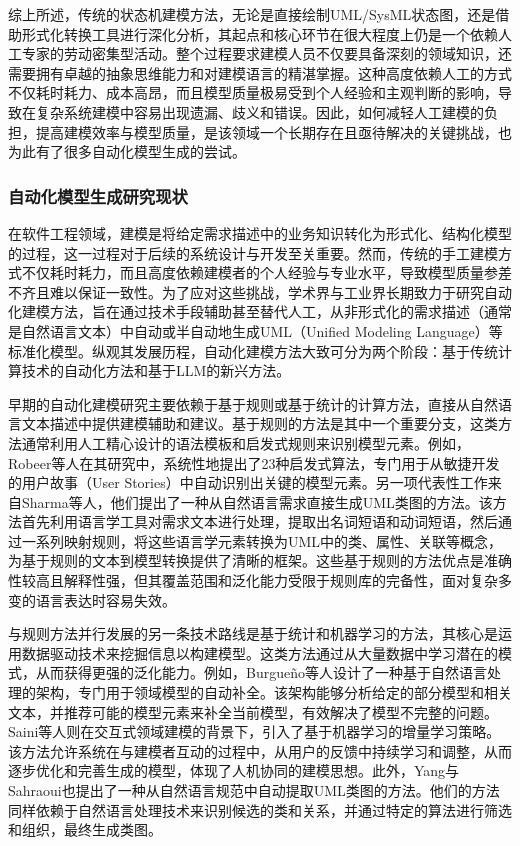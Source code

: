 综上所述，传统的状态机建模方法，无论是直接绘制UML/SysML状态图，还是借助形式化转换工具进行深化分析，其起点和核心环节在很大程度上仍是一个依赖人工专家的劳动密集型活动。整个过程要求建模人员不仅要具备深刻的领域知识，还需要拥有卓越的抽象思维能力和对建模语言的精湛掌握。这种高度依赖人工的方式不仅耗时耗力、成本高昂，而且模型质量极易受到个人经验和主观判断的影响，导致在复杂系统建模中容易出现遗漏、歧义和错误。因此，如何减轻人工建模的负担，提高建模效率与模型质量，是该领域一个长期存在且亟待解决的关键挑战，也为此有了很多自动化模型生成的尝试。


\subsubsection{自动化模型生成研究现状}

在软件工程领域，建模是将给定需求描述中的业务知识转化为形式化、结构化模型的过程，这一过程对于后续的系统设计与开发至关重要。然而，传统的手工建模方式不仅耗时耗力，而且高度依赖建模者的个人经验与专业水平，导致模型质量参差不齐且难以保证一致性。为了应对这些挑战，学术界与工业界长期致力于研究自动化建模方法，旨在通过技术手段辅助甚至替代人工，从非形式化的需求描述（通常是自然语言文本）中自动或半自动地生成UML（Unified Modeling Language）等标准化模型。纵观其发展历程，自动化建模方法大致可分为两个阶段：基于传统计算技术的自动化方法和基于LLM的新兴方法。

早期的自动化建模研究主要依赖于基于规则或基于统计的计算方法，直接从自然语言文本描述中提供建模辅助和建议。基于规则的方法是其中一个重要分支，这类方法通常利用人工精心设计的语法模板和启发式规则来识别模型元素。例如，Robeer等人在其研究中，系统性地提出了23种启发式算法，专门用于从敏捷开发的用户故事（User Stories）中自动识别出关键的模型元素。另一项代表性工作来自Sharma等人，他们提出了一种从自然语言需求直接生成UML类图的方法。该方法首先利用语言学工具对需求文本进行处理，提取出名词短语和动词短语，然后通过一系列映射规则，将这些语言学元素转换为UML中的类、属性、关联等概念，为基于规则的文本到模型转换提供了清晰的框架。这些基于规则的方法优点是准确性较高且解释性强，但其覆盖范围和泛化能力受限于规则库的完备性，面对复杂多变的语言表达时容易失效。

与规则方法并行发展的另一条技术路线是基于统计和机器学习的方法，其核心是运用数据驱动技术来挖掘信息以构建模型。这类方法通过从大量数据中学习潜在的模式，从而获得更强的泛化能力。例如，Burgueño等人设计了一种基于自然语言处理的架构，专门用于领域模型的自动补全。该架构能够分析给定的部分模型和相关文本，并推荐可能的模型元素来补全当前模型，有效解决了模型不完整的问题。Saini等人则在交互式领域建模的背景下，引入了基于机器学习的增量学习策略。该方法允许系统在与建模者互动的过程中，从用户的反馈中持续学习和调整，从而逐步优化和完善生成的模型，体现了人机协同的建模思想。此外，Yang与Sahraoui也提出了一种从自然语言规范中自动提取UML类图的方法。他们的方法同样依赖于自然语言处理技术来识别候选的类和关系，并通过特定的算法进行筛选和组织，最终生成类图。

